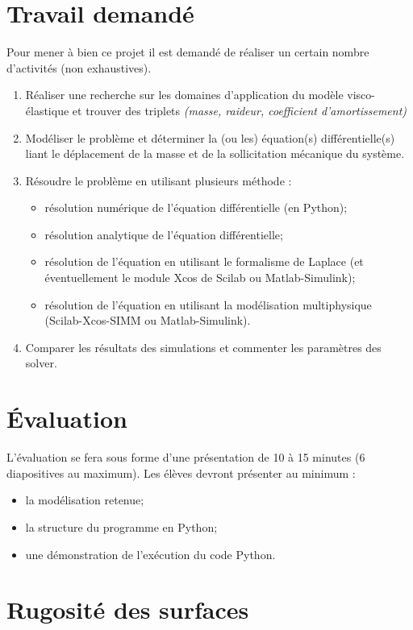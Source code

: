 \documentclass[10pt,fleqn]{article} %
\begin{document}
\begin{multicols}{2}
\section*{Travail demandé} 
Pour mener à bien ce projet il est demandé de réaliser un certain nombre d'activités (non exhaustives).
\begin{enumerate}
\item Réaliser une recherche sur les domaines d'application du modèle visco-élastique et trouver des triplets \textit{(masse, raideur, coefficient d'amortissement)}
\item Modéliser le problème et déterminer la (ou les) équation(s) différentielle(s) liant le déplacement de la masse et de la sollicitation mécanique du système.
\item Résoudre le problème en utilisant plusieurs méthode : 
\begin{itemize}
\item résolution numérique de l'équation différentielle (en Python);
\item résolution analytique de l'équation différentielle;
\item résolution de l'équation en utilisant le formalisme de Laplace (et éventuellement le module Xcos de Scilab ou Matlab-Simulink);
\item résolution de l'équation en utilisant la modélisation multiphysique (Scilab-Xcos-SIMM ou Matlab-Simulink).
\end{itemize}
\item Comparer les résultats des simulations et commenter les paramètres des solver.
\end{enumerate}

\section*{Évaluation}
L'évaluation se fera sous forme d'une présentation de 10 à 15 minutes (6 diapositives au maximum). Les élèves devront présenter au minimum : 
\begin{itemize}
\item la modélisation retenue;
\item la structure du programme en Python;
\item une démonstration de l'exécution du code Python.
\end{itemize}


\section*{Rugosité des surfaces}

\end{multicols}
\end{document}
